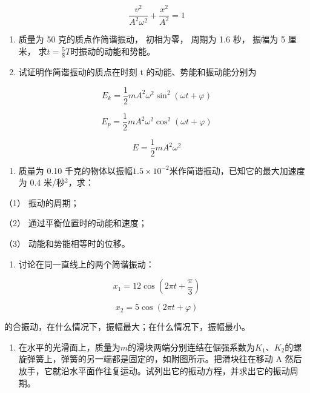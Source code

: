 \[
\frac{v^2}{A^2\omega^2}+\frac{x^2}{A^2}=1
\]

\begin{enumerate}
\def\labelenumi{\arabic{enumi}.}
\setcounter{enumi}{12}
\item
  质量为 50 克的质点作简谐振动， 初相为零， 周期为 1.6 秒， 振幅为 5
  厘米， 求\(t = \frac{5}{8} T\)时振动的动能和势能。
\item
  试证明作简谐振动的质点在时刻 t 的动能、势能和振动能分别为
\end{enumerate}

\[
E_k=\frac12mA^2\omega^2\sin^2(\omega t+\varphi)
\]

\[
E_p=\frac12mA^2\omega^2\cos^2(\omega t+\varphi)
\]

\[
E=\frac12mA^2\omega^2
\]

\begin{enumerate}
\def\labelenumi{\arabic{enumi}.}
\setcounter{enumi}{14}
\tightlist
\item
  质量为 0.10
  千克的物体以振幅\(1.5 \times 10^{-2}\)米作简谐振动，已知它的最大加速度为
  0.4 米/秒\(^{2}\)，求：
\end{enumerate}

（1） 振动的周期；

（2） 通过平衡位置时的动能和速度；

（3） 动能和势能相等时的位移。

\begin{enumerate}
\def\labelenumi{\arabic{enumi}.}
\setcounter{enumi}{15}
\tightlist
\item
  讨论在同一直线上的两个简谐振动：
\end{enumerate}

\[
x _ {1} = 12 \cos \left(2 \pi t + \frac {\pi}{3}\right)
\]

\[
x _ {2} = 5 \cos (2 \pi t + \varphi)
\]

的合振动，在什么情况下，振幅最大；在什么情况下，振幅最小。

\begin{enumerate}
\def\labelenumi{\arabic{enumi}.}
\setcounter{enumi}{16}
\tightlist
\item
  在水平的光滑面上，质量为\(m\)的滑块两端分别连结在倔强系数为\(K_{1}\)、\(K_{2}\)的螺旋弹簧上，弹簧的另一端都是固定的，如附图所示。把滑块往在移动
  A
  然后放手，它就沿水平面作往复运动。试列出它的振动方程，并求出它的振动周期。
\end{enumerate}

